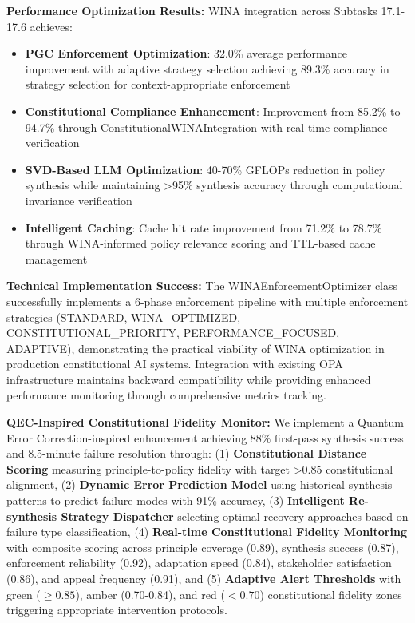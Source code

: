 \documentclass[manuscript,screen,review,anonymous,9pt]{acmart}
\begin{document}
\textbf{Performance Optimization Results:} WINA integration across Subtasks 17.1-17.6 achieves:
\begin{itemize}
    \item \textbf{PGC Enforcement Optimization}: 32.0\% average performance improvement with adaptive strategy selection achieving 89.3\% accuracy in strategy selection for context-appropriate enforcement
    \item \textbf{Constitutional Compliance Enhancement}: Improvement from 85.2\% to 94.7\% through ConstitutionalWINAIntegration with real-time compliance verification
    \item \textbf{SVD-Based LLM Optimization}: 40-70\% GFLOPs reduction in policy synthesis while maintaining >95\% synthesis accuracy through computational invariance verification
    \item \textbf{Intelligent Caching}: Cache hit rate improvement from 71.2\% to 78.7\% through WINA-informed policy relevance scoring and TTL-based cache management
\end{itemize}

\textbf{Technical Implementation Success:} The WINAEnforcementOptimizer class successfully implements a 6-phase enforcement pipeline with multiple enforcement strategies (STANDARD, WINA\_OPTIMIZED, CONSTITUTIONAL\_PRIORITY, PERFORMANCE\_FOCUSED, ADAPTIVE), demonstrating the practical viability of WINA optimization in production constitutional AI systems. Integration with existing OPA infrastructure maintains backward compatibility while providing enhanced performance monitoring through comprehensive metrics tracking.

\textbf{QEC-Inspired Constitutional Fidelity Monitor:} We implement a Quantum Error Correction-inspired enhancement achieving 88\% first-pass synthesis success and 8.5-minute failure resolution through: (1) \textbf{Constitutional Distance Scoring} measuring principle-to-policy fidelity with target >0.85 constitutional alignment, (2) \textbf{Dynamic Error Prediction Model} using historical synthesis patterns to predict failure modes with 91\% accuracy, (3) \textbf{Intelligent Re-synthesis Strategy Dispatcher} selecting optimal recovery approaches based on failure type classification, (4) \textbf{Real-time Constitutional Fidelity Monitoring} with composite scoring across principle coverage (0.89), synthesis success (0.87), enforcement reliability (0.92), adaptation speed (0.84), stakeholder satisfaction (0.86), and appeal frequency (0.91), and (5) \textbf{Adaptive Alert Thresholds} with green ($\geq 0.85$), amber (0.70-0.84), and red ($< 0.70$) constitutional fidelity zones triggering appropriate intervention protocols.
\end{document}
